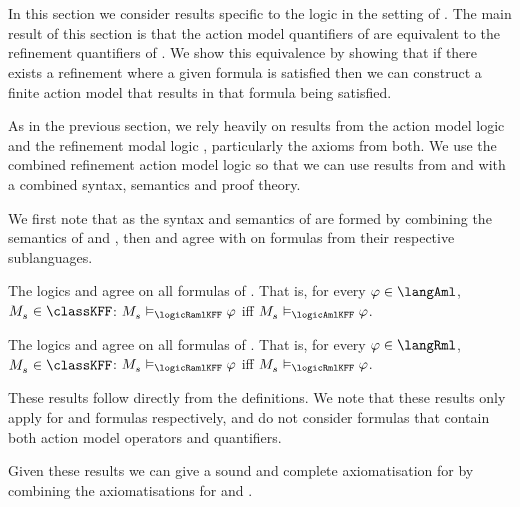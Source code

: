 \section{\classKFF{}}\label{aaml-kd45}

In this section we consider results specific to the logic \logicAamlKFF{} in the setting of \classKFF{}.
The main result of this section is that the action model quantifiers of \logicAamlKFF{} are equivalent to the refinement quantifiers of \logicRmlKFF{}.
We show this equivalence by showing that if there exists a refinement where a given formula is satisfied then we can construct a finite action model that results in that formula being satisfied.

As in the previous section, we rely heavily on results from the action model logic \logicAmlKFF{} and the refinement modal logic \logicRmlKFF{}, particularly the axioms from both.
We use the combined refinement action model logic \logicRamlKFF{} so that we can use results from \logicAmlKFF{} and \logicRmlKFF{} with a combined syntax, semantics and proof theory.

We first note that as the syntax and semantics of \logicRamlKFF{} are formed by combining the semantics of \logicAmlKFF{} and \logicRmlKFF{}, then \logicAmlKFF{} and \logicRmlKFF{} agree with \logicRamlKFF{} on formulas from their respective sublanguages.

\begin{lemma}\label{raml-k45-aml}
The logics \logicRamlKFF{} and \logicAmlKFF{} agree on all formulas of \langAml{}.
That is, for every $\phi \in \langAml$, $\kPModel{\kStateS} \in \classKFF$: $\kPModel{\kStateS} \entails_\logicRamlKFF \phi$ iff $\kPModel{\kStateS} \entails_\logicAmlKFF \phi$.
\end{lemma}

\begin{lemma}\label{raml-k45-rml}
The logics \logicRamlKFF{} and \logicAmlKFF{} agree on all formulas of \langRml{}.
That is, for every $\phi \in \langRml$, $\kPModel{\kStateS} \in \classKFF$: $\kPModel{\kStateS} \entails_\logicRamlKFF \phi$ iff $\kPModel{\kStateS} \entails_\logicRmlKFF \phi$.
\end{lemma}

These results follow directly from the definitions.
We note that these results only apply for \langAml{} and \langRml{} formulas respectively, and do not consider \langAaml{} formulas that contain both action model operators and quantifiers. 

Given these results we can give a sound and complete axiomatisation for \logicRamlKFF{} by combining the axiomatisations for \logicAmlKFF{} and \logicRmlKFF{}.

